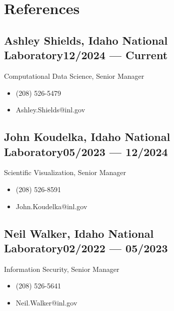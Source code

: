 \documentclass[letterpaper,11pt]{article}
\begin{document}
    \setlength{\itemsep}{-.5pt}
\section{\color{cvblue}References }
\subsection*{{\color{cvblue}Ashley Shields,} Idaho National Laboratory\hfill 12/2024 --- Current}
Computational Data Science, Senior Manager
\begin{itemize}
    \setlength{\itemsep}{-.5pt}
    \item (208) 526-5479
    \item Ashley.Shields@inl.gov
\end{itemize}
 
\subsection*{{\color{cvblue}John Koudelka,} Idaho National Laboratory\hfill 05/2023 --- 12/2024}
Scientific Visualization, Senior Manager
\begin{itemize}
    \setlength{\itemsep}{-.5pt}
    \item (208) 526-8591
    \item John.Koudelka@inl.gov
\end{itemize}
 
\subsection*{{\color{cvblue}Neil Walker,} Idaho National Laboratory\hfill 02/2022 --- 05/2023}
Information Security, Senior Manager
\begin{itemize}
    \setlength{\itemsep}{-.5pt}
    \item (208) 526-5641
    \item Neil.Walker@inl.gov
\end{itemize}
\end{document}
